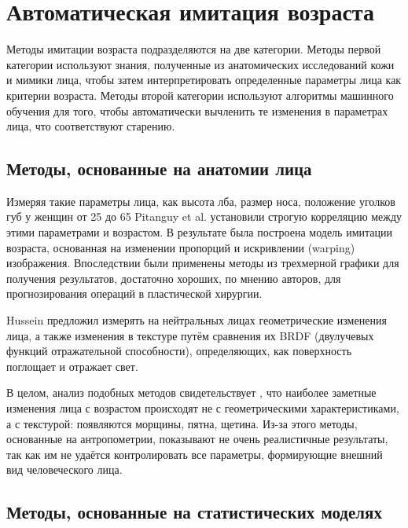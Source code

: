 \newpage
\section{Автоматическая имитация возраста}

Методы имитации возраста подразделяются на две категории. Методы первой категории используют знания, полученные из анатомических исследований кожи и мимики лица, чтобы затем интерпретировать определенные параметры лица как критерии возраста. Методы второй категории используют алгоритмы машинного обучения для того, чтобы автоматически вычленить те изменения в параметрах лица, что соответствуют старению. 

\subsection{Методы, основанные на анатомии лица}

Измеряя такие параметры лица, как высота лба, размер носа, положение уголков губ у женщин от 25 до 65 Pitanguy et al. \cite{pitanguy1} \cite{pitanguy2} установили строгую корреляцию между этими параметрами и возрастом. В результате была построена модель имитации возраста, основанная на изменении пропорций и искривлении (warping) изображения. Впоследствии были применены методы из трехмерной графики для получения результатов, достаточно хороших, по мнению авторов, для прогнозирования операций в пластической хирургии.

Hussein \cite{hussein} предложил измерять на нейтральных лицах геометрические изменения лица, а также изменения в текстуре путём сравнения их BRDF (двулучевых функций отражательной способности), определяющих, как поверхность поглощает и отражает свет.

В целом, анализ подобных методов свидетельствует \cite{statya_big}, что наиболее заметные изменения лица с возрастом происходят не с геометрическими характеристиками, а с текстурой: появляются морщины, пятна, щетина. Из-за этого методы, основанные на антропометрии, показывают не очень реалистичные результаты, так как им не удаётся контролировать все параметры, формирующие внешний вид человеческого лица.

\subsection{Методы, основанные на статистических моделях}


